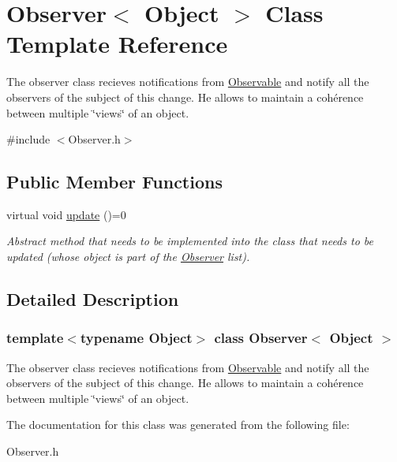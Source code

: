 \hypertarget{class_observer}{}\section{Observer$<$ Object $>$ Class Template Reference}
\label{class_observer}


The observer class recieves notifications from \mbox{\hyperlink{class_observable}{Observable}} and notify all the observers of the subject of this change. He allows to maintain a cohérence between multiple \char`\"{}views\char`\"{} of an object.  




{\ttfamily \#include $<$Observer.\+h$>$}

\subsection*{Public Member Functions}
\begin{DoxyCompactItemize}
\item 
\mbox{\label{class_observer_aa202c639f77abebbbcd94a66939df41c}} 
virtual void \mbox{\hyperlink{class_observer_aa202c639f77abebbbcd94a66939df41c}{update}} ()=0
\begin{DoxyCompactList}\small\item\em Abstract method that needs to be implemented into the class that needs to be updated (whose object is part of the \mbox{\hyperlink{class_observer}{Observer}} list). \end{DoxyCompactList}\end{DoxyCompactItemize}


\subsection{Detailed Description}
\subsubsection*{template$<$typename Object$>$\newline
class Observer$<$ Object $>$}

The observer class recieves notifications from \mbox{\hyperlink{class_observable}{Observable}} and notify all the observers of the subject of this change. He allows to maintain a cohérence between multiple \char`\"{}views\char`\"{} of an object. 

The documentation for this class was generated from the following file\+:\begin{DoxyCompactItemize}
\item 
Observer.\+h\end{DoxyCompactItemize}
